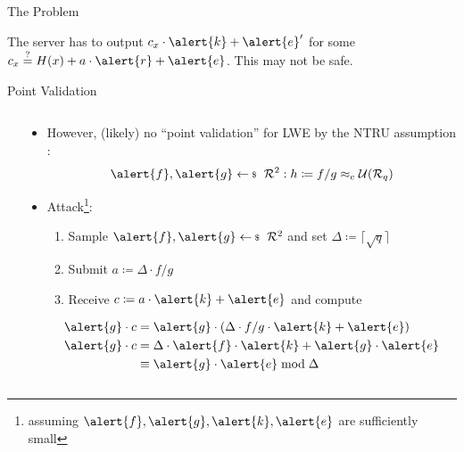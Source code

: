 \documentclass[xcolor=table,10pt,aspectratio=169]{beamer}
\providecommand{\ring}[0]{\ensuremath{\mathcal{R}}\xspace}
\providecommand{\ring}[0]{\ensuremath{\mathcal{R}}\xspace}
\begin{document}
\begin{frame}[label={sec:org3e06570}]{The Problem}
\begin{center}
The server has to output \(c_{x} \cdot \alert{k} + \alert{e}'\) for some \(c_x \overset{?}{=}  H(x) + a \cdot \alert{r} + \alert{e}\). This may not be safe.
\end{center}
\end{frame}
\begin{frame}[label={sec:org30ea146},fragile]{Point Validation}
\begin{columns}
\begin{column}[t]{0.5\columnwidth}
\newcommand{\mfi}[1]{\fbox{\texttt{[image: \#1]}}}
\setlength{\fboxsep}{0pt}
\end{column}
\begin{column}[t]{0.5\columnwidth}
\pause
\pause

\begin{itemize}
\item However, (likely) no ``point validation'' for LWE by the NTRU assumption \cite{NTRU:HPS98}:
\[
  \alert{f}, \alert{g} \sample \ring^{2}: h \coloneqq f/g \approx_{c} \mathcal{U}(\ring_q)
  \]
\item Attack\footnote{assuming \(\alert{f},\alert{g},\alert{k},\alert{e}\) are sufficiently small}:
\begin{enumerate}
\item Sample \(\alert{f},\alert{g} \sample \ring^{2}\) and set \(\Delta \coloneqq  \lceil \sqrt{q} \rceil\)
\item Submit \(a \coloneqq \Delta \cdot f/g\)
\item Receive \(c \coloneqq a \cdot \alert{k} + \alert{e}\) and compute
\end{enumerate}
\begin{align*}
  \alert{g} \cdot c & = \alert{g} \cdot (\Delta \cdot f/g \cdot \alert{k} + \alert{e})\\
  \alert{g} \cdot c & = \Delta \cdot \alert{f} \cdot \alert{k} + \alert{g} \cdot \alert{e}\\
        &\equiv \alert{g} \cdot \alert{e} \bmod \Delta
\end{align*}
\end{itemize}
\end{column}
\end{columns}
\end{frame}
\end{document}

